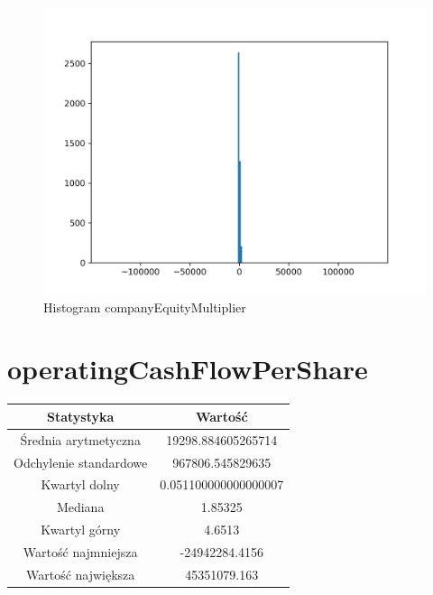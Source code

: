 \documentclass{article}
\begin{document}
\begin{figure}[h!]
    \includegraphics[width=\linewidth]{variables/companyEquityMultiplier.png}
    \caption{Histogram companyEquityMultiplier }
\end{figure}\section{ operatingCashFlowPerShare }

\begin{center}
    \begin{tabular}{|c | c|} 
    \hline
    Statystyka & Wartość \\
    \hline\hline
    Średnia arytmetyczna & 19298.884605265714 \\ 
    \hline
    Odchylenie standardowe & 967806.545829635 \\
    \hline
    Kwartyl dolny & 0.051100000000000007 \\
    \hline
    Mediana & 1.85325 \\
    \hline
    Kwartyl górny & 4.6513 \\
    \hline
    Wartość najmniejsza & -24942284.4156 \\
    \hline
    Wartość największa & 45351079.163 \\
    \hline
   \end{tabular}
\end{center}
\end{document}
